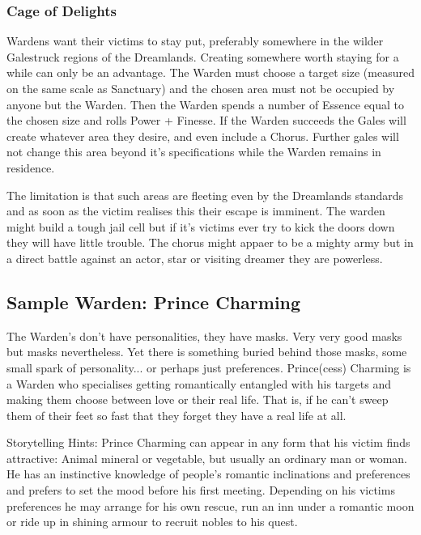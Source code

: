 \subsubsection*{Cage of Delights}

Wardens want their victims to stay put, preferably somewhere in the wilder Galestruck regions of the Dreamlands. Creating somewhere worth staying for a while can only be an advantage. The Warden must choose a target size (measured on the same scale as Sanctuary) and the chosen area must not be occupied by anyone but the Warden. Then the Warden spends a number of Essence equal to the chosen size and rolls Power + Finesse. If the Warden succeeds the Gales will create whatever area they desire, and even include a Chorus. Further gales will not change this area beyond it's specifications while the Warden remains in residence. 

The limitation is that such areas are fleeting even by the Dreamlands standards and as soon as the victim realises this their escape is imminent. The warden might build a tough jail cell but if it's victims ever try to kick the doors down they will have little trouble. The chorus might appaer to be a mighty army but in a direct battle against an actor, star or visiting dreamer they are powerless. 

\subsection*{Sample Warden: Prince Charming}

The Warden's don't have personalities, they have masks. Very very good masks but masks nevertheless. Yet there is something buried behind those masks, some small spark of personality... or perhaps just preferences. Prince(cess) Charming is a Warden who specialises getting romantically entangled with his targets and making them choose between love or their real life. That is, if he can't sweep them of their feet so fast that they forget they have a real life at all. 

Storytelling Hints: Prince Charming can appear in any form that his victim finds attractive: Animal mineral or vegetable, but usually an ordinary man or woman. He has an instinctive knowledge of people's romantic inclinations and preferences and prefers to set the mood before his first meeting. Depending on his victims preferences he may arrange for his own rescue, run an inn under a romantic moon or ride up in shining armour to recruit nobles to his quest. 

